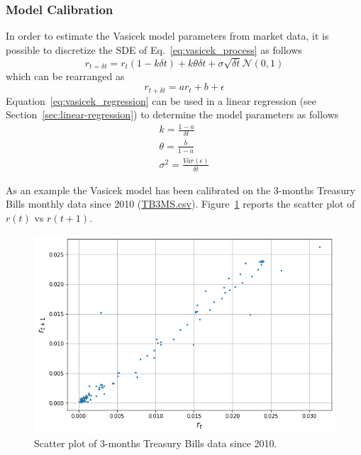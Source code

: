 \subsubsection{Model Calibration}
In order to estimate the Vasicek model parameters from market data, it is possible to discretize the SDE of Eq.~\ref{eq:vasicek_process} as follows
\begin{equation*}
r_{t=\delta t} = r_t (1-k\delta t) + k\theta\delta t + \sigma \sqrt{\delta t}\mathcal{N}(0,1)
\end{equation*}
which can be rearranged as
\begin{equation}
r_{t+\delta t} = ar_t + b + \epsilon
\label{eq:vasicek_regression}
\end{equation}
Equation~\ref{eq:vasicek_regression} can be used in a linear regression (see Section~\ref{sec:linear-regression}) to determine the model parameters as follows
\begin{equation}
\begin{gathered}
k = \frac{1-a}{\delta t} \\
\theta = \frac{b}{1-a} \\
\sigma^2 = \frac{Var(\epsilon)}{\delta t}
\end{gathered}
\label{eq:vasicek_parameters_estimate}
\end{equation}

As an example the Vasicek model has been calibrated on the 3-months Treasury Bills monthly data since 2010 (\href{https://raw.githubusercontent.com/matteosan1/finance_course/develop/libro/input_files/TB3MS.csv}{TB3MS.csv}). Figure~\ref{fig:TB3MS} reports the scatter plot of $r(t)$ vs $r(t+1)$.

\begin{figure}[htb]
\centering
\includegraphics[width=0.7\linewidth]{figures/TB3MS}
\caption{Scatter plot of 3-months Treasury Bills data since 2010.}
\label{fig:TB3MS}
\end{figure}

